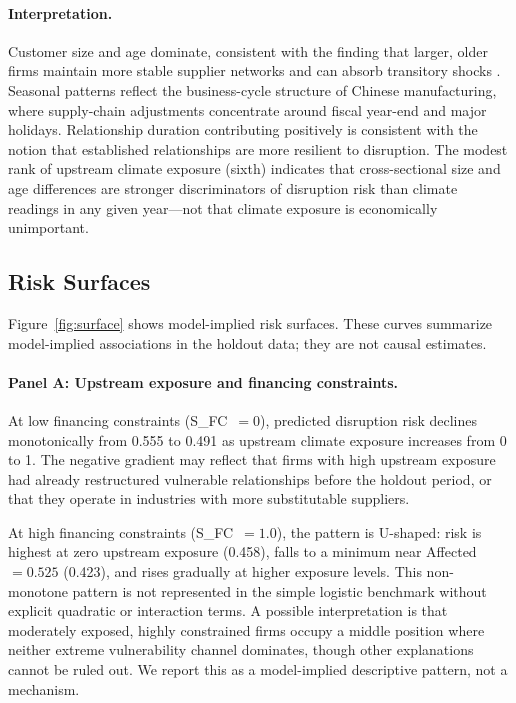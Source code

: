 \documentclass[12pt]{article}
\begin{document}
\paragraph{Interpretation.}
Customer size and age dominate, consistent with the finding that larger,
older firms maintain more stable supplier networks and can absorb
transitory shocks \citep{hendricks2005empirical}.  Seasonal patterns
reflect the business-cycle structure of Chinese manufacturing, where
supply-chain adjustments concentrate around fiscal year-end and major
holidays.  Relationship duration contributing positively is consistent
with the notion that established relationships are more resilient to
disruption.  The modest rank of upstream climate exposure (sixth) indicates
that cross-sectional size and age differences are stronger discriminators
of disruption risk than climate readings in any given year---not that
climate exposure is economically unimportant.

\subsection{Risk Surfaces}

Figure~\ref{fig:surface} shows model-implied risk surfaces.  These
curves summarize model-implied associations in the holdout data; they are
not causal estimates.

\paragraph{Panel A: Upstream exposure and financing constraints.}
At low financing constraints (S\_FC~$= 0$), predicted disruption risk
declines monotonically from 0.555 to 0.491 as upstream climate exposure
increases from 0 to 1.  The negative gradient may reflect that firms
with high upstream exposure had already restructured vulnerable
relationships before the holdout period, or that they operate in
industries with more substitutable suppliers.

At high financing constraints (S\_FC~$= 1.0$), the pattern is U-shaped:
risk is highest at zero upstream exposure (0.458), falls to a minimum near
Affected~$= 0.525$ (0.423), and rises gradually at higher exposure levels.
This non-monotone pattern is not represented in the simple logistic
benchmark without explicit quadratic or interaction terms.  A possible
interpretation is that moderately exposed, highly constrained firms occupy
a middle position where neither extreme vulnerability channel dominates,
though other explanations cannot be ruled out.  We report this as a
model-implied descriptive pattern, not a mechanism.
\end{document}

